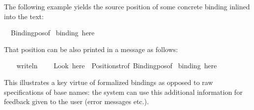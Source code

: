 \begin{isabellebody}
\begin{isamarkuptext}
\begin{description}
  \end{description}%
\end{isamarkuptext}%
\isamarkuptrue%
%
\endisatagmlantiq
{\isafoldmlantiq}%
%
\isadelimmlantiq
%
\endisadelimmlantiq
%
\isadelimmlex
%
\endisadelimmlex
%
\isatagmlex
%
\begin{isamarkuptext}%
The following example yields the source position of some
  concrete binding inlined into the text:%
\end{isamarkuptext}%
\isamarkuptrue%
%
\endisatagmlex
{\isafoldmlex}%
%
\isadelimmlex
%
\endisadelimmlex
%
\isadelimML
%
\endisadelimML
%
\isatagML
{}\isamarkupfalse%
\ {}\ Binding{}pos{}of\ %
\isaantiq
binding\ here{}%
\endisaantiq
\ {}%
\endisatagML
{\isafoldML}%
%
\isadelimML
%
\endisadelimML
%
\begin{isamarkuptext}%
\medskip That position can be also printed in a message as
  follows:%
\end{isamarkuptext}%
\isamarkuptrue%
%
\isadelimML
%
\endisadelimML
%
\isatagML
{}\isamarkupfalse%
\ {}\isanewline
\ \ writeln\isanewline
\ \ \ \ {}{}Look\ here{}\ {}\ Position{}str{}of\ {}Binding{}pos{}of\ %
\isaantiq
binding\ here{}%
\endisaantiq
{}{}\isanewline
{}%
\endisatagML
{\isafoldML}%
%
\isadelimML
%
\endisadelimML
%
\begin{isamarkuptext}%
This illustrates a key virtue of formalized bindings as
  opposed to raw specifications of base names: the system can use this
  additional information for feedback given to the user (error
  messages etc.).%
\end{isamarkuptext}%
\isamarkuptrue%
%
\isadelimtheory
%
\endisadelimtheory
%
\isatagtheory
{}\isamarkupfalse%
%
\endisatagtheory
{\isafoldtheory}%
%
\isadelimtheory
%
\endisadelimtheory
\isanewline
\end{isabellebody}%
